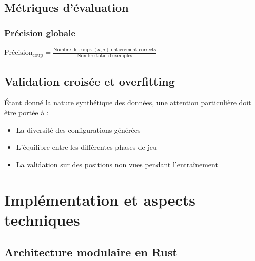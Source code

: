 \documentclass[12pt,a4paper]{report}
\numberwithin{equation}{section}
\begin{document}
\section{Métriques d'évaluation}


\subsection{Précision globale}
$\text{Précision}_{\text{coup}} = \frac{\text{Nombre de coups }(d,a)\text{ entièrement corrects}}{\text{Nombre total d'exemples}}$

\section{Validation croisée et overfitting}

\begin{remark}
Étant donné la nature synthétique des données, une attention particulière doit être portée à :
\begin{itemize}
  \item La diversité des configurations générées
  \item L'équilibre entre les différentes phases de jeu
  \item La validation sur des positions non vues pendant l'entraînement
\end{itemize}
\end{remark}

\chapter{Implémentation et aspects techniques}

\section{Architecture modulaire en Rust}
\end{document}
